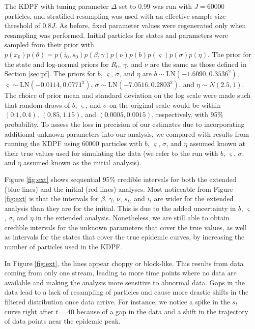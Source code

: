\documentclass{elsarticle}
\newcommand{\danny}[1]{{\color{blue} DANNY: #1}}
\begin{document}
The KDPF with tuning parameter $\Delta$ set to 0.99 was run with $J = 60000$ particles, and stratified resampling was used with an effective sample size threshold of $0.8J$. As before, fixed parameter values were regenerated only when resampling was performed. Initial particles for states and parameters were sampled from their prior with $p(x_0)p(\theta) = p(i_0, s_0)p(\beta, \gamma)p(\nu)p(b)p(\varsigma)p(\sigma)p(\eta)$. The prior for the state and log-normal priors for $R_0$, $\gamma$, and $\nu$ are the same as those defined in Section \ref{sec:pf}. The priors for $b$, $\varsigma$, $\sigma$, and $\eta$ are $b \sim \mbox{LN}(-1.6090, 0.3536^2)$, $\varsigma \sim \mbox{LN}(-0.0114, 0.0771^2)$, $\sigma \sim \mbox{LN}(-7.0516, 0.2803^2)$, and $\eta \sim N(2.5, 1)$. The choice of prior mean and standard deviation on the log scale were made such that random draws of $b$, $\varsigma$, and $\sigma$ on the original scale would be within $(0.1, 0.4)$, $(0.85, 1.15)$, and $(0.0005, 0.0015)$, respectively, with 95\% probability. To assess the loss in precision of our estimates due to incorporating additional unknown parameters into our analysis, we compared with results from running the KDPF using 60000 particles with $b$, $\varsigma$, $\sigma$, and $\eta$ assumed known at their true values used for simulating the data (we refer to the run with $b$, $\varsigma$, $\sigma$, and $\eta$ assumed known as the initial analysis). %

Figure \ref{fig:ext} shows sequential 95\% credible intervals for both the extended (blue lines) and the initial (red lines) analyses. Most noticeable from Figure \ref{fig:ext} is that the intervals for $\beta$, $\gamma$, $\nu$, $s_t$, and $i_t$ are wider for the extended analysis than they are for the initial. This is due to the added uncertainty in $b$, $\varsigma$, $\sigma$, and $\eta$ in the extended analysis. Nonetheless, we are still able to obtain credible intervals for the unknown parameters that cover the true values, as well as intervals for the states that cover the true epidemic curves, by increasing the number of particles used in the KDPF.

In Figure \ref{fig:ext}, the lines appear choppy or block-like. This results from data coming from only one stream, leading to more time points where no data are available and making the analysis more sensitive to abnormal data. Gaps in the data lead to a lack of resampling of particles and cause more drastic shifts in the filtered distribution once data arrive. For instance, we notice a spike in the $s_t$ curve right after $t = 40$ because of a gap in the data and a shift in the trajectory of data points near the epidemic peak.
\end{document}
